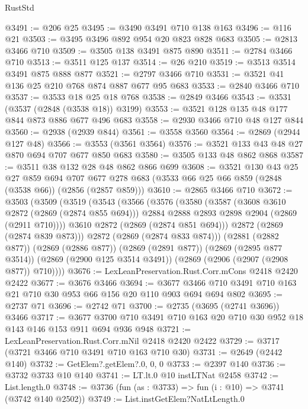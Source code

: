 \begin{lexlean}{RustStd}
\begin{coremodule}
@3491 := @206 @25
@3495 := @3490 @3491 @710 @138 @163
@3496 := @116 @21
@3503 := @3495 @3496 @892 @954 @20 @823 @828 @683
@3505 := @2813 @3466 @710
@3509 := @3505 @138 @3491 @875 @890
@3511 := @2784 @3466 @710
@3513 := @3511 @125 @137
@3514 := @26 @210
@3519 := @3513 @3514 @3491 @875 @888 @877
@3521 := @2797 @3466 @710
@3531 := @3521 @41 @136 @25 @210 @768 @874 @887 @677 @95 @683
@3533 := @2840 @3466 @710
@3537 := @3533 @18 @25 @18 @768
@3538 := @2849 @3466
@3543 := @3531 (@3537 (@2848 (@3538 @18)) @3199)
@3553 := @3521 @128 @135 @48 @177 @844 @873 @886 @677 @496 @683
@3558 := @2930 @3466 @710 @48 @127 @844
@3560 := @2938 (@2939 @844)
@3561 := @3558 @3560
@3564 := @2869 (@2944 @127 @48)
@3566 := @3553 (@3561 @3564)
@3576 := @3521 @133 @43 @48 @27 @870 @694 @707 @677 @850 @683
@3580 := @3505 @133 @48 @862 @868
@3587 := @3511 @38 @132 @28 @48 @862 @866 @699
@3608 := @3521
    @130
    @43
    @25
    @27
    @859
    @694
    @707
    @677
    @278
    @683
    (@3533 @66 @25 @66 @859 (@2848 (@3538 @66)) (@2856 (@2857 @859)))
@3610 := @2865 @3466 @710
@3672 := @3503
    (@3509
      (@3519
        (@3543
          (@3566
            (@3576
              (@3580
                (@3587
                  (@3608 @3610 @2872 (@2869 (@2874 @855 @694)))
                  @2884
                  @2888
                  @2893
                  @2898
                  @2904
                  (@2869 (@2911 @710))))
              @3610
              @2872
              (@2869 (@2874 @851 @694)))
            @2872
            (@2869 (@2874 @839 @873)))
          @2872
          (@2869 (@2874 @833 @874)))
        (@2881 (@2882 @877))
        (@2869 (@2886 @877))
        (@2869 (@2891 @877))
        (@2869 (@2895 @877 @3514))
        (@2869 (@2900 @125 @3514 @3491))
        (@2869 (@2906 (@2907 (@2908 @877)) @710))))
@3676 := LexLeanPreservation.Rust.Corr.mCons @2418 @2420 @2422
@3677 := @3676 @3466
@3694 := @3677 @3466 @710 @3491 @710 @163 @21 @710 @30 @953 @66 @156 @20 @110 @903 @694 @694 @802
@3695 := @2737 @71
@3696 := @2742 @71
@3700 := @2735 (@3695 (@2741 @3696)) @3466
@3717 := @3677 @3700 @710 @3491 @710 @163 @20 @710 @30 @952 @18 @143 @146 @153 @911 @694 @936 @948
@3721 := LexLeanPreservation.Rust.Corr.mNil @2418 @2420 @2422
@3729 := @3717 (@3721 @3466 @710 @3491 @710 @163 @710 @30)
@3731 := @2649 (@2442 @140)
@3732 := GetElem?.getElem?.{0, 0, 0}
@3733 := @2397 @140
@3736 := @3732 @3733 @10 @140
@3741 := LT.lt.{0} @10 instLTNat @2458
@3742 := List.length.{0}
@3748 := @3736 (fun (as : @3733) => fun (i : @10) => @3741 (@3742 @140 @2502))
@3749 := List.instGetElem?NatLtLength.{0}

\end{coremodule}
\end{lexlean}
